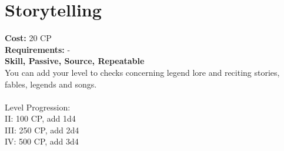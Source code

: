 \section{Storytelling}
\textbf{Cost:} 20 CP\\
\textbf{Requirements:} -\\
\textbf{Skill, Passive, Source, Repeatable}\\
You can add your level to checks concerning legend lore and reciting stories, fables, legends and songs.\\ 
\\
Level Progression:\\
II: 100 CP, add 1d4\\
III: 250 CP, add 2d4\\
IV: 500 CP, add 3d4\\